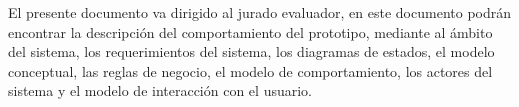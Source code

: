 El presente documento va dirigido al jurado evaluador, en este documento podrán encontrar la descripción del comportamiento del prototipo, 
mediante al ámbito del sistema, los requerimientos del sistema, los diagramas de estados, el modelo conceptual, las reglas de negocio, 
el modelo de comportamiento, los actores del sistema y el modelo de interacción con el usuario.\\